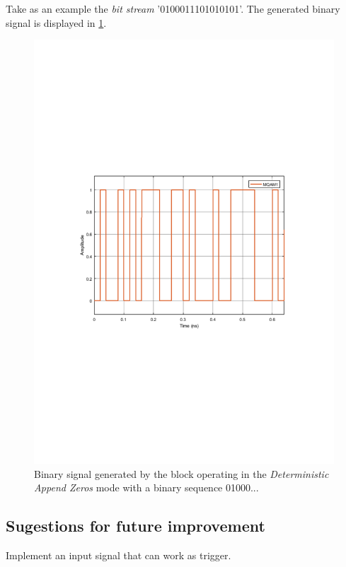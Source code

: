 Take as an example the \textit{bit stream} '0100011101010101'. The generated binary signal is displayed in \ref{MQAM1_DeterministAppendZeros}.

\begin{figure}
	\centering
	\includegraphics[width=\textwidth]{./lib/binary_source/figures/BinarySource_output}
	
	\caption{Binary signal generated by the block operating in the \textit{Deterministic Append Zeros} mode with a binary sequence 01000...}\label{MQAM1_DeterministAppendZeros}
\end{figure}

\subsection*{Sugestions for future improvement}

Implement an input signal that can work as trigger.

